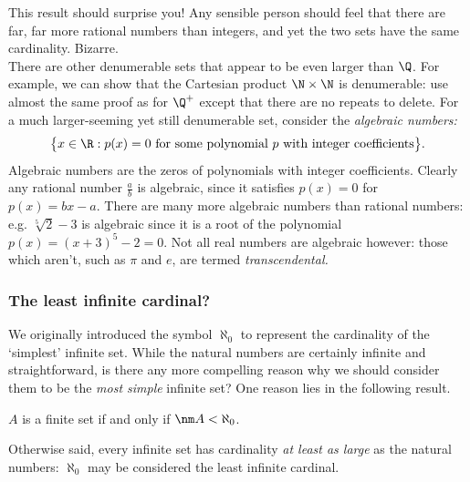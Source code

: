 \noindent This result should surprise you! Any sensible person should feel that there are far, far more rational numbers than integers, and yet the two sets have the same cardinality. Bizarre.\\

There are other denumerable sets that appear to be even larger than $\Q$. For example, we can show that the Cartesian product $\N\times\N$ is denumerable: use almost the same proof as for $\Q^+$ except that there are no repeats to delete. For a much larger-seeming yet still denumerable set, consider the \emph{algebraic numbers:}
\[\big\{x\in\R:p(x)=0\text{ for some polynomial $p$ with integer coefficients}\big\}.\]
Algebraic numbers are the zeros of polynomials with integer coefficients. Clearly any rational number $\frac ab$ is algebraic, since it satisfies $p(x)=0$ for $p(x)=bx-a$. There are many more algebraic numbers than rational numbers: e.g. $\sqrt[5]{2}-3$ is algebraic since it is a root of the polynomial $p(x)=(x+3)^5-2=0$. Not all real numbers are algebraic however: those which aren't, such as $\pi$ and $e$, are termed \emph{transcendental.}

\subsubsection*{The least infinite cardinal?}

We originally introduced the symbol $\aleph_0$ to represent the cardinality of the `simplest' infinite set. While the natural numbers are certainly infinite and straightforward, is there any more compelling reason why we should consider them to be the \emph{most simple} infinite set? One reason lies in the following result.

\begin{thm}\label{thm:finitealeph}
$A$ is a finite set if and only if $\nm A<\aleph_0$.
\end{thm}

\noindent Otherwise said, every infinite set has cardinality \emph{at least as large} as the natural numbers: $\aleph_0$ may be considered the least infinite cardinal.

